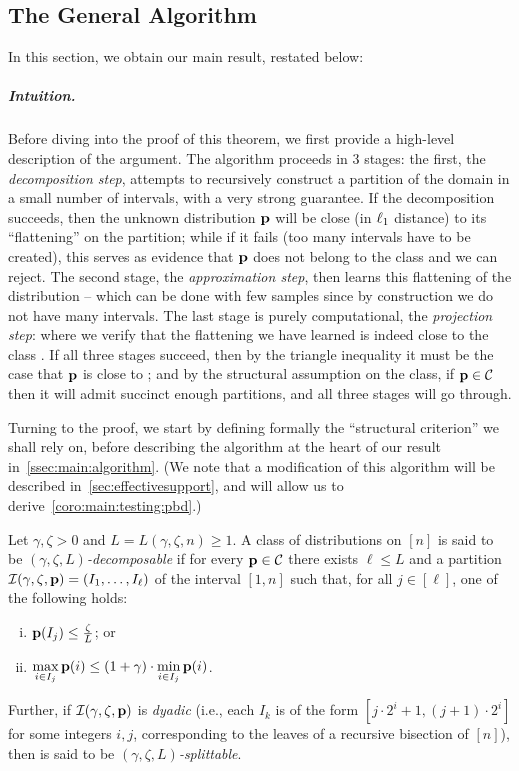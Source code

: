 \subsection{The General Algorithm}\label{sec:algorithm}
In this section, we obtain our main result, restated below:
\mainthmtestingalgo*

\subparagraph{Intuition.} Before diving into the proof of this theorem, we first provide a high-level description of the argument. The algorithm proceeds in 3 stages: the first, the \emph{decomposition step}, attempts to recursively construct a partition of the domain in a small number of intervals, with a very strong guarantee. If the decomposition succeeds, then the unknown distribution $\D$ will be close (in $\lp[1]$ distance) to its ``flattening'' on the partition; while if it fails (too many intervals have to be created), this serves as evidence that $\D$ does not belong to the class and we can reject. The second stage, the \emph{approximation step}, then learns this flattening of the distribution -- which can be done with few samples since by construction we do not have many intervals. The last stage is purely computational, the \emph{projection step}: where we verify that the flattening we have learned is indeed close to the class \class. If all three stages succeed, then by the triangle inequality it must be the case that $\D$ is close to \class; and by the structural assumption on the class, if $\D\in\class$ then it will admit succinct enough partitions, and all three stages will go through.\medskip

\noindent Turning to the proof, we start by defining formally the ``structural criterion'' we shall rely on, before describing the algorithm at the heart of our result in~\cref{ssec:main:algorithm}. (We note that a modification of this algorithm will be described in~\cref{sec:effectivesupport}, and will allow us to derive~\cref{coro:main:testing:pbd}.)

\begin{definition}[Decompositions]\label{def:struct:dec:split}
Let $\gamma,  \zeta > 0$ and $L=L(\gamma,\zeta,n)\geq 1$.  A class of distributions \class on $[n]$ is said to be \emph{$(\gamma,\zeta,L)$-decomposable} if for every $\D\in\class$ there exists $\ell \leq L$ and a partition $\mathcal{I}(\gamma,\zeta,\D)=(I_1,\dots,I_\ell)$ of the interval $[1,n]$ such that, for all $j\in[\ell]$, one of the following holds:
\begin{enumerate}[(i)]
  \item\label{def:struct:item:light}  $\D(I_j) \leq \frac{\zeta}{L}$; or 
  \item\label{def:struct:item:flat} $\displaystyle \max_{i \in I_j} \D(i)\leq  (1+\gamma)\cdot \min_{i \in I_j} \D(i)$.
\end{enumerate}
Further, if $\mathcal{I}(\gamma,\zeta,\D)$ is \emph{dyadic} (i.e., each $I_k$ is of the form $[j\cdot 2^i+1,(j+1)\cdot 2^i]$ for some integers $i,j$, corresponding to the leaves of a recursive bisection of $[n]$), then \class is said to be \emph{$(\gamma,\zeta,L)$-splittable}.
\end{definition}

